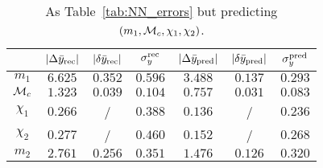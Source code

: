 \begin{table}
  \caption{\label{tab:NN_errors_temp} As Table~\ref{tab:NN_errors} but predicting $(m_1, {\cal{M}}_c, \chi_1, \chi_2)$. }
  \begin{center}
  \begin{tabular}{c|ccc|ccc}
  \hline\hline
  & $|\Delta \bar{y}_{\rm rec}|$  & $|\delta \bar{y}_{\rm rec}|$  & $\sigma_y^{\rm rec}$ &
     $|\Delta \bar{y}_{\rm pred}|$ & $|\delta \bar{y}_{\rm pred}|$ & $\sigma_y^{\rm pred}$ \\
  \hline\hline
$m_1$          & $6.625$ & $0.352$ & $0.596$ & $3.488$ & $0.137$ & $0.293$ \\
${\cal{M}}_c$  & $1.323$ & $0.039$ & $0.104$ & $0.757$ & $0.031$ & $0.083$ \\
$\chi_1$       & $0.266$ &  /  & $0.388$ & $0.136$ &  /  & $0.236$ \\
$\chi_2$       & $0.277$ &  /  & $0.460$ & $0.152$ &  /  & $0.268$ \\
\hline
$m_2$          & $2.761$ & $0.256$ & $0.351$ & $1.476$ & $0.126$ & $0.320$ \\
  \hline\hline
\end{tabular}
\end{center}
\end{table}

